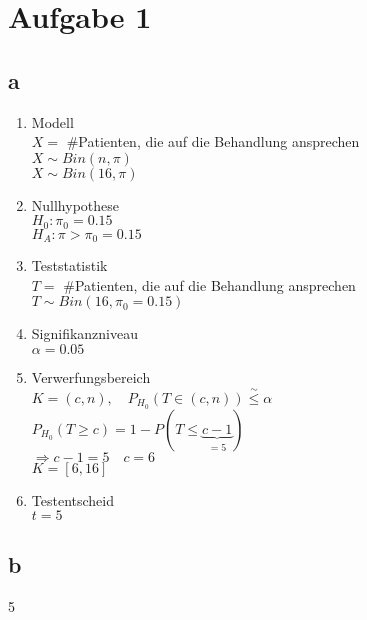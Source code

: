 

\section{Aufgabe 1}

\subsection{a}
\begin{enumerate}
  \item Modell \\
        $X =$ \#Patienten, die auf die Behandlung ansprechen\\
        $X \sim Bin(n,\pi)$\\
        $X \sim Bin(16,\pi)$
  \item Nullhypothese \\
        $H_0: \pi_0 = 0.15$\\
        $H_A: \pi > \pi_0 = 0.15$
  \item Teststatistik \\
        $T =$ \#Patienten, die auf die Behandlung ansprechen \\
        $T \sim Bin(16,\pi_0 = 0.15)$
  \item Signifikanzniveau \\
        $\alpha = 0.05$
  \item Verwerfungsbereich \\
        $K = (c,n), \quad P_{H_0}(T \in (c,n)) \stackrel{\sim}{\leq} \alpha$\\
        $P_{H_0}(T \geq c) = 1 - P(T \leq \underbrace{c - 1}_{= 5})$\\
        $\Rightarrow c - 1 = 5 \quad c = 6$\\
        $K = [6, 16]$
  \item Testentscheid\\
        $t = 5$
\end{enumerate}

\subsection{b}
5

